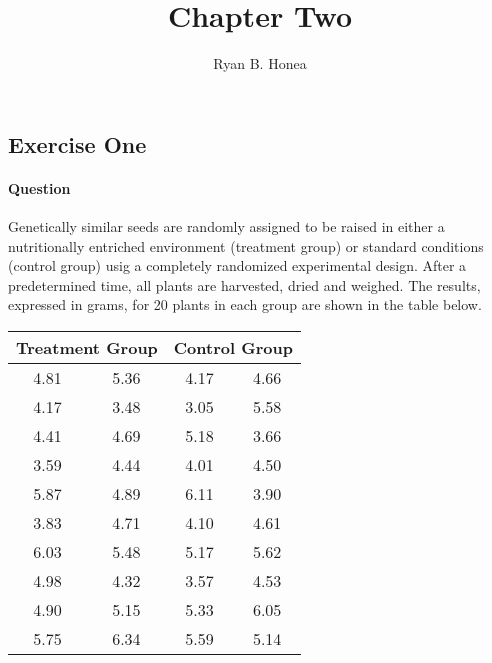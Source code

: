 \documentclass[]{article}
\title{Chapter Two}
\author{Ryan B. Honea}
\date{}
\let\oldparagraph\paragraph
\renewcommand{\paragraph}[1]{\oldparagraph{#1}\mbox{}}
\begin{document}
\maketitle

\subsection{Exercise One}\label{exercise-one}

\paragraph{Question}\label{question}

Genetically similar seeds are randomly assigned to be raised in either a
nutritionally entriched environment (treatment group) or standard
conditions (control group) usig a completely randomized experimental
design. After a predetermined time, all plants are harvested, dried and
weighed. The results, expressed in grams, for 20 plants in each group
are shown in the table below.

\begin{center}
\begin{tabular}{@{}cccc@{}}
\toprule
\multicolumn{2}{l}{Treatment Group} & \multicolumn{2}{l}{Control Group} \\ \midrule
4.81             & 5.36             & 4.17            & 4.66            \\
4.17             & 3.48             & 3.05            & 5.58            \\
4.41             & 4.69             & 5.18            & 3.66            \\
3.59             & 4.44             & 4.01            & 4.50            \\
5.87             & 4.89             & 6.11            & 3.90            \\
3.83             & 4.71             & 4.10            & 4.61            \\
6.03             & 5.48             & 5.17            & 5.62            \\
4.98             & 4.32             & 3.57            & 4.53            \\
4.90             & 5.15             & 5.33            & 6.05            \\
5.75             & 6.34             & 5.59            & 5.14            \\ \bottomrule
\end{tabular}
\end{center}
\end{document}
